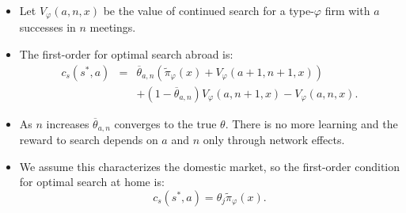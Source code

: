 \documentclass[notes=show]{beamer}
\begin{document}
\begin{frame}%



\begin{itemize}
\item Let $V_{\varphi }(a,n,x)$ be the value of continued search for a type-$%
\varphi $ firm with $a$ successes in $n$ meetings.

\item The first-order for optimal search abroad is:%
\hyperref{}{}{optimal_search}{}%
\begin{eqnarray*}
c_{s}(s^{\ast },a) &=&\overline{\theta }_{a,n}(\widetilde{\pi }_{\varphi
}(x)+V_{\varphi }(a+1,n+1,x)) \\
&&+(1-\overline{\theta }_{a,n})V_{\varphi }(a,n+1,x)-V_{\varphi }(a,n,x).
\end{eqnarray*}
\end{itemize}

\end{frame}%
\begin{frame}%



\begin{itemize}
\item As $n$ increases $\overline{\theta }_{a,n}$ converges to the true $%
\theta .$ There is no more learning and the reward to search depends on $a$
and $n$ only through network effects.

\item We assume this characterizes the domestic market, so the first-order
condition for optimal search at home is:%
\[
c_{s}(s^{\ast },a)=\theta _{j}\widetilde{\pi }_{\varphi }(x). 
\]
\end{itemize}

\end{frame}%
\end{document}
